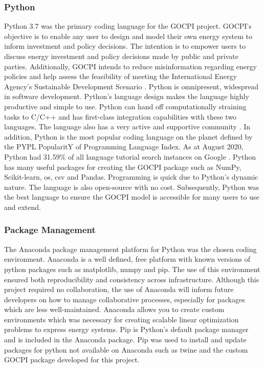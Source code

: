 \documentclass[12pt]{article}
\begin{document}
\subsubsection{Python}\label{python}
Python 3.7 was the primary coding language for the GOCPI project. 
GOCPI's objective is to enable any user to design and model their own energy system to inform investment and policy decisions.
The intention is to empower users to discuss energy investment and policy decisions made by public and private parties.
Additionally, GOCPI intends to reduce misinformation regarding energy policies and help assess the feasibility of meeting the International Energy Agency's Sustainable Development Scenario \cite{IEA_WEM}.
Python is omnipresent, widespread in software development. 
Python's language design makes the language highly productive and simple to use. 
Python can hand off computationally straining tasks to C/C++ and has first-class integration capabilities with these two languages.
The language also has a very active and supportive community \cite{Python_Features}.
In addition, Python is the most popular coding language on the planet defined by the PYPL PopularitY of Programming Language Index. 
As at August 2020, Python had 31.59\% of all language tutorial search instances on Google \cite{PYPL_Pop}.
Python has many useful packages for creating the GOCPI package such as NumPy, Scikit-learn, os, csv and Pandas. 
Programming is quick due to Python's dynamic nature.
The language is also open-source with no cost.
Subsequently, Python was the best language to ensure the GOCPI model is accessible for many users to use and extend.

\subsubsection{Package Management}
The Anaconda package management platform for Python \cite{Anaconda} was the chosen coding environment.
Anaconda is a well defined, free platform with known versions of python packages such as matplotlib, numpy and pip.
The use of this environment ensured both reproducibility and consistency across infrastructure.
Although this project required no collaboration, the use of Anaconda will inform future developers on how to manage collaborative processes, especially for packages which are less well-maintained. Anaconda allows you to create custom environments which was necessary for creating scalable linear optimization problems to express energy systems.
Pip is Python's default package manager and is included in the Anaconda package. 
Pip was used to install and update packages for python not available on Anaconda such as twine and the custom GOCPI package developed for this project.
\end{document}
